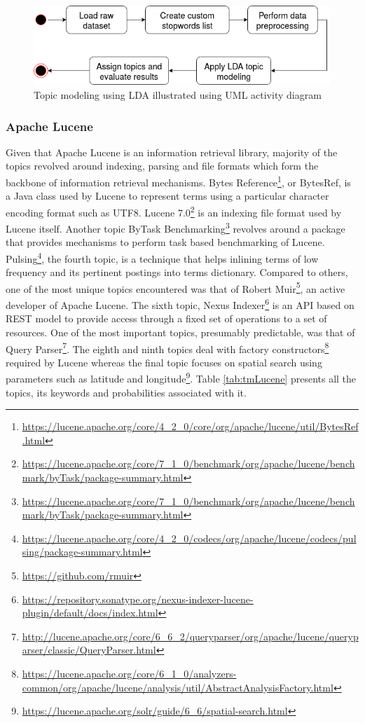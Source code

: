 \documentclass[a4paper,12pt,twoside]{report}
\begin{document}
\begin{figure}[h] %
    \centering
    \includegraphics[width=12cm]{topic-modeling}
    \caption{Topic modeling using \acs{LDA} illustrated using UML activity diagram}
    \label{fig:topicmodelClass}
\end{figure}

\subsubsection{Apache Lucene} 
Given that Apache Lucene is an information retrieval library, majority of the topics revolved around indexing, parsing and file formats which form the backbone of information retrieval mechanisms. Bytes Reference\footnote{\url{https://lucene.apache.org/core/4_2_0/core/org/apache/lucene/util/BytesRef.html}}, or BytesRef, is a Java class used by Lucene to represent terms using a particular character encoding format such as UTF8. Lucene 7.0\footnote{\url{https://lucene.apache.org/core/7_1_0/benchmark/org/apache/lucene/benchmark/byTask/package-summary.html}} is an indexing file format used by Lucene itself. Another topic ByTask Benchmarking\footnote{\url{https://lucene.apache.org/core/7_1_0/benchmark/org/apache/lucene/benchmark/byTask/package-summary.html}} revolves around a package that provides mechanisms to perform task based benchmarking of Lucene. Pulsing\footnote{\url{https://lucene.apache.org/core/4_2_0/codecs/org/apache/lucene/codecs/pulsing/package-summary.html}}, the fourth topic, is a technique that helps inlining terms of low frequency and its pertinent postings into terms dictionary. Compared to others, one of the most unique topics encountered was that of Robert Muir\footnote{\url{https://github.com/rmuir}}, an active developer of Apache Lucene. The sixth topic, Nexus Indexer\footnote{\url{https://repository.sonatype.org/nexus-indexer-lucene-plugin/default/docs/index.html}} is an API based on REST model to provide access through a fixed set of operations to a set of resources. One of the most important topics, presumably predictable, was that of Query Parser\footnote{\url{http://lucene.apache.org/core/6_6_2/queryparser/org/apache/lucene/queryparser/classic/QueryParser.html}}. The eighth and ninth topics deal with factory constructors\footnote{\url{https://lucene.apache.org/core/6_1_0/analyzers-common/org/apache/lucene/analysis/util/AbstractAnalysisFactory.html}} required by Lucene whereas the final topic focuses on spatial search using parameters such as latitude and longitude\footnote{\url{https://lucene.apache.org/solr/guide/6_6/spatial-search.html}}. Table \ref{tab:tmLucene} presents all the topics, its keywords and probabilities associated with it. 
\end{document}

